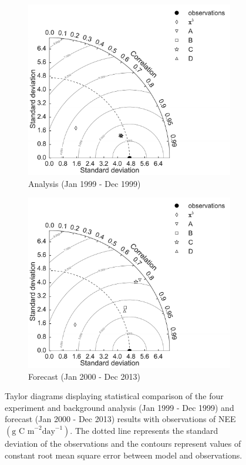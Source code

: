 \begin{figure}[ht]
    \centering
    \begin{subfigure}[b]{0.49\textwidth}
        \includegraphics[width=\textwidth]{chapter/chapter6/td.pdf}
        \caption{Analysis (Jan 1999 - Dec 1999)}
        \label{chap6:fig:td_a}
    \end{subfigure}
    \begin{subfigure}[b]{0.49\textwidth}
        \includegraphics[width=\textwidth]{chapter/chapter6/tdf.pdf}
        \caption{Forecast (Jan 2000 - Dec 2013)}
        \label{chap6:fig:td_f}
    \end{subfigure}
    \caption{Taylor diagrams displaying statistical comparison of the four experiment and background analysis (Jan 1999 - Dec 1999) and forecast (Jan 2000 - Dec 2013) results with observations of NEE $( \text{g C m}^{-2}\text{day}^{-1})$. The dotted line represents the standard deviation of the observations and the contours represent values of constant root mean square error between model and observations.}
    \label{chap6:fig:taylordiag}
\end{figure}

